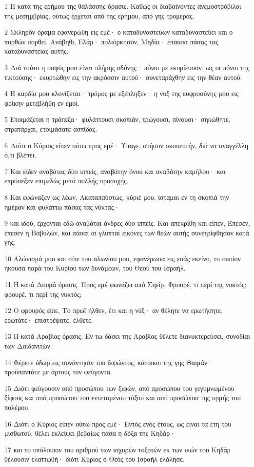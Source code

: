 \par 1 Η κατά της ερήμου της θαλάσσης όρασις. Καθώς οι διαβαίνοντες ανεμοστρόβιλοι της μεσημβρίας, ούτως έρχεται από της ερήμου, από γης τρομεράς.
\par 2 Σκληρόν όραμα εφανερώθη εις εμέ· ο καταδυναστεύων καταδυναστεύει και ο πορθών πορθεί. Ανάβηθι, Ελάμ· πολιόρκησον, Μηδία· έπαυσα πάσας τας καταδυναστείας αυτής.
\par 3 Διά τούτο η οσφύς μου είναι πλήρης οδύνης· πόνοι με εκυρίευσαν, ως οι πόνοι της τικτούσης· εκυρτώθην εις την ακρόασιν αυτού· συνεταράχθην εις την θέαν αυτού.
\par 4 Η καρδία μου κλονίζεται· τρόμος με εξέπληξεν· η νυξ της ευφροσύνης μου εις φρίκην μετεβλήθη εν εμοί.
\par 5 Ετοιμάζεται η τράπεζα· φυλάττουσι σκοπιάν, τρώγουσι, πίνουσι· σηκώθητε, στρατάρχαι, ετοιμάσατε ασπίδας.
\par 6 Διότι ο Κύριος είπεν ούτω προς εμέ· Ύπαγε, στήσον σκοπευτήν, διά να αναγγέλλη ό,τι βλέπει.
\par 7 Και είδεν αναβάτας δύο ιππείς, αναβάτην όνου και αναβάτην καμήλου· και επρόσεξεν επιμελώς μετά πολλής προσοχής.
\par 8 Και εφώναξεν ως λέων, Ακαταπαύστως, κύριέ μου, ίσταμαι εν τη σκοπιά την ημέραν και φυλάττω πάσας τας νύκτας·
\par 9 και ιδού, έρχονται εδώ αναβάται άνδρες δύο ιππείς. Και απεκρίθη και είπεν, Έπεσεν, έπεσεν η Βαβυλών, και πάσαι αι γλυπταί εικόνες των θεών αυτής συνετρίφθησαν κατά γης.
\par 10 Αλώνισμά μου και σίτε του αλωνίου μου, εφανέρωσα εις εσάς εκείνο, το οποίον ήκουσα παρά του Κυρίου των δυνάμεων, του Θεού του Ισραήλ.
\par 11 Η κατά Δουμά όρασις. Προς εμέ φωνάζει από Σηείρ, Φρουρέ, τι περί της νυκτός; φρουρέ, τι περί της νυκτός;
\par 12 Ο φρουρός είπε, Το πρωΐ ήλθεν, έτι και η νύξ· αν θέλητε να ερωτήσητε, ερωτάτε· επιστρέψατε, έλθετε.
\par 13 Η κατά Αραβίας όρασις. Εν τω δάσει της Αραβίας θέλετε διανυκτερεύσει, συνοδίαι των Δαιδανιτών.
\par 14 Φέρετε ύδωρ εις συνάντησιν του διψώντος, κάτοικοι της γης Θαιμάν· προϋπαντάτε με άρτους τον φεύγοντα.
\par 15 Διότι φεύγουσιν από προσώπου των ξιφών, από προσώπου του γεγυμνωμένου ξίφους και από προσώπου του εντεταμένου τόξου και από προσώπου της ορμής του πολέμου.
\par 16 Διότι ο Κύριος είπεν ούτω προς εμέ· Εντός ενός έτους, ως είναι τα έτη του μισθωτού, θέλει εκλείψει βεβαίως πάσα η δόξα της Κηδάρ·
\par 17 και το υπόλοιπον του αριθμού των ισχυρών τοξοτών εκ των υιών του Κηδάρ θέλουσιν ελαττωθή· διότι Κύριος ο Θεός του Ισραήλ ελάλησε.

